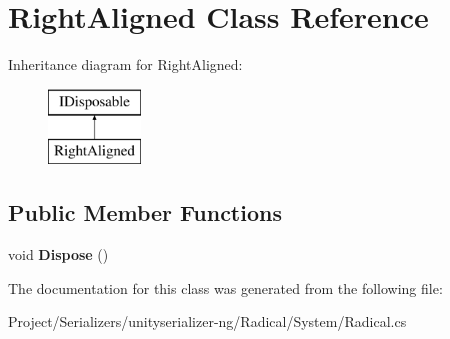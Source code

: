 \hypertarget{class_right_aligned}{}\section{Right\+Aligned Class Reference}
\label{class_right_aligned}
Inheritance diagram for Right\+Aligned\+:\begin{figure}[H]
\begin{center}
\leavevmode
\includegraphics[height=2.000000cm]{class_right_aligned}
\end{center}
\end{figure}
\subsection*{Public Member Functions}
\begin{DoxyCompactItemize}
\item 
\mbox{\label{class_right_aligned_aeb1d1e6b5a8a70d2fb506c70eaf1a517}} 
void {\bfseries Dispose} ()
\end{DoxyCompactItemize}


The documentation for this class was generated from the following file\+:\begin{DoxyCompactItemize}
\item 
Project/\+Serializers/unityserializer-\/ng/\+Radical/\+System/Radical.\+cs\end{DoxyCompactItemize}
